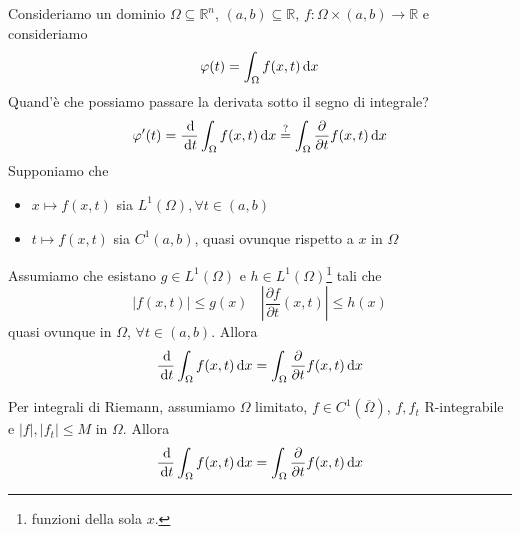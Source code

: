 Consideriamo un dominio $\Omega \subseteq \mathbb{R}^{n}$, $(a,b) \subseteq \mathbb{R}$, $f:\Omega \times (a,b)\rightarrow \mathbb{R}$ e consideriamo
\begin{equation*}
    \varphi (t) =\int _{\Omega } f(x,t) \,\mathrm d x
\end{equation*}
Quand'è che possiamo passare la derivata sotto il segno di integrale?
\begin{equation*}
    \varphi '(t) =\frac{\,\mathrm d}{\,\mathrm d t}\int _{\Omega } f(x,t) \,\mathrm d x\overset{?}{=}\int _{\Omega }\frac{\partial }{\partial t} f(x,t) \,\mathrm d x
\end{equation*}
Supponiamo che
\begin{itemize}
    \item $\displaystyle x\mapsto f(x,t)$ sia $\displaystyle L^{1}(\Omega),\forall t\in (a,b)$
    \item $\displaystyle t\mapsto f(x,t)$ sia $\displaystyle C^{1}(a,b)$, quasi ovunque rispetto a $x$ in $\displaystyle \Omega $
\end{itemize}
\begin{theorem}
    Assumiamo che esistano $g\in L^{1}(\Omega)$ e $h\in L^{1}(\Omega)$\footnote{funzioni della sola $x$.} tali che
    \begin{equation*}
        | f(x,t)| \leq g(x) \ \ \ \ \left| \frac{\partial f}{\partial t}(x,t)\right| \leq h(x)
    \end{equation*}
    quasi ovunque in $\displaystyle \Omega $, $\displaystyle \forall t\in (a,b)$. Allora
    \begin{equation*}
        \frac{\,\mathrm d}{\,\mathrm d t}\int _{\Omega } f(x,t) \,\mathrm d x=\int _{\Omega }\frac{\partial }{\partial t} f(x,t) \,\mathrm d x
    \end{equation*}
\end{theorem}
Per integrali di Riemann, assumiamo $\Omega $ limitato, $f\in C^{1}(\overline{\Omega })$, $f,f_{t}$ R-integrabile e $| f|,| f_{t}| \leq M$ in $\Omega $. Allora
\begin{equation*}
    \frac{\,\mathrm d}{\,\mathrm d t}\int _{\Omega } f(x,t) \,\mathrm d x=\int _{\Omega }\frac{\partial }{\partial t} f(x,t) \,\mathrm d x
\end{equation*}